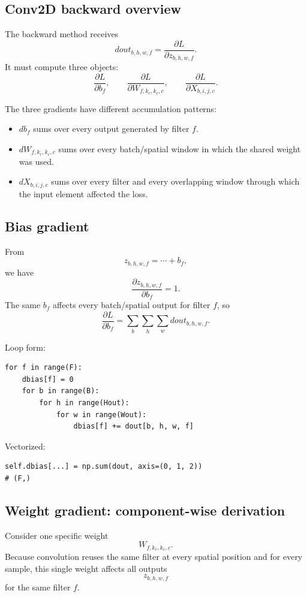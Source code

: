 \documentclass[11pt,a4paper]{article}
\newcommand{\pd}[2]{\frac{\partial #1}{\partial #2}}
\begin{document}
\subsection{Conv2D backward overview}

The backward method receives
\[
dout_{b,h,w,f}=\pd{L}{z_{b,h,w,f}}.
\]
It must compute three objects:
\[
\pd{L}{b_f},
\qquad
\pd{L}{W_{f,k_r,k_c,c}},
\qquad
\pd{L}{X_{b,i,j,c}}.
\]

The three gradients have different accumulation patterns:
\begin{itemize}
    \item $db_f$ sums over every output generated by filter $f$.
    \item $dW_{f,k_r,k_c,c}$ sums over every batch/spatial window in which the shared weight was used.
    \item $dX_{b,i,j,c}$ sums over every filter and every overlapping window through which the input element affected the loss.
\end{itemize}

\subsection{Bias gradient}

From
\[
z_{b,h,w,f}=\cdots+b_f,
\]
we have
\[
\pd{z_{b,h,w,f}}{b_f}=1.
\]
The same $b_f$ affects every batch/spatial output for filter $f$, so
\[
\boxed{
\pd{L}{b_f}
=
\sum_b\sum_h\sum_w dout_{b,h,w,f}
}.
\]

Loop form:
\begin{lstlisting}
for f in range(F):
    dbias[f] = 0
    for b in range(B):
        for h in range(Hout):
            for w in range(Wout):
                dbias[f] += dout[b, h, w, f]
\end{lstlisting}

Vectorized:
\begin{lstlisting}
self.dbias[...] = np.sum(dout, axis=(0, 1, 2))
# (F,)
\end{lstlisting}

\subsection{Weight gradient: component-wise derivation}

Consider one specific weight
\[
W_{f,k_r,k_c,c}.
\]
Because convolution reuses the same filter at every spatial position and for every sample, this single weight affects all outputs
\[
z_{b,h,w,f}
\]
for the same filter $f$.
\end{document}
